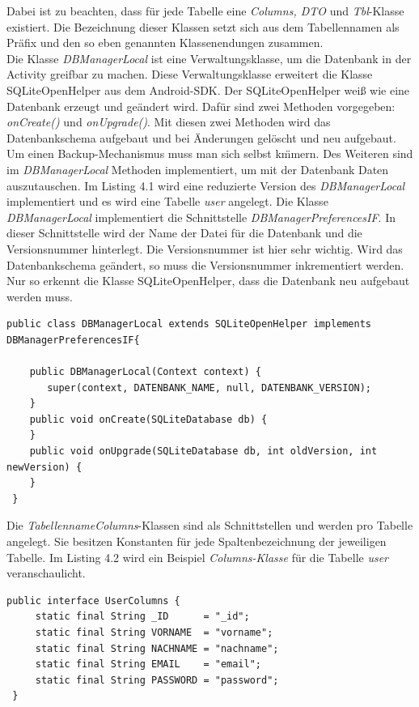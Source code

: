 Dabei ist zu beachten, dass f\"ur jede Tabelle eine \emph{Columns, DTO} und \emph{Tbl}-Klasse existiert. 
Die Bezeichnung dieser Klassen setzt sich aus dem Tabellennamen als Pr\"afix und den so eben genannten Klassenendungen zusammen.\\

Die Klasse \emph{DBManagerLocal} ist eine Verwaltungsklasse, um die Datenbank in der Activity greifbar zu machen.
Diese Verwaltungsklasse erweitert die Klasse SQLiteOpenHelper aus dem Android-SDK.
Der SQLiteOpenHelper wei\ss{} wie eine Datenbank erzeugt und ge\"andert wird.
Daf\"ur sind zwei Methoden vorgegeben: \emph{onCreate()} und \emph{onUpgrade()}.
Mit diesen zwei Methoden wird das Datenbankschema aufgebaut und bei \"Anderungen gel\"oscht und neu aufgebaut.
Um einen Backup-Mechanismus muss man sich selbst k\"mmern.
Des Weiteren sind im \emph{DBManagerLocal} Methoden implementiert, um mit der Datenbank Daten auszutauschen.
Im Listing 4.1 wird eine reduzierte Version des \emph{DBManagerLocal} implementiert und es wird eine Tabelle \emph{user} angelegt.
Die Klasse \emph{DBManagerLocal} implementiert die Schnittstelle \emph{DBManagerPreferencesIF}.
In dieser Schnittstelle wird der Name der Datei f\"ur die Datenbank und die Versionsnummer hinterlegt.
Die Versionsnummer ist hier sehr wichtig.
Wird das Datenbankschema ge\"andert, so muss die Versionsnummer inkrementiert werden.
Nur so erkennt die Klasse SQLiteOpenHelper, dass die Datenbank neu aufgebaut werden muss.\\

\begin{lstlisting}[caption={Beispiel f\"ur reduzierte Implementierung der \emph{DBManagerLocal} Klasse}]
 public class DBManagerLocal extends SQLiteOpenHelper implements DBManagerPreferencesIF{ 
 
    public DBManagerLocal(Context context) {
       super(context, DATENBANK_NAME, null, DATENBANK_VERSION);
    } 
    public void onCreate(SQLiteDatabase db) { 
    }    
    public void onUpgrade(SQLiteDatabase db, int oldVersion, int newVersion) {
    }
 }
\end{lstlisting}

Die \emph{TabellennameColumns}-Klassen sind als Schnittstellen und werden pro Tabelle angelegt.
Sie besitzen Konstanten f\"ur jede Spaltenbezeichnung der jeweiligen Tabelle.
Im Listing 4.2 wird ein Beispiel \emph{Columns-Klasse} f\"ur die Tabelle \emph{user} veranschaulicht.\\

\begin{lstlisting}[caption={Die Schnittstelle \emph{UserColumns}}]
 public interface UserColumns {
     static final String _ID      = "_id";
     static final String VORNAME  = "vorname";
     static final String NACHNAME = "nachname";
     static final String EMAIL    = "email";
     static final String PASSWORD = "password";
 }
\end{lstlisting}

